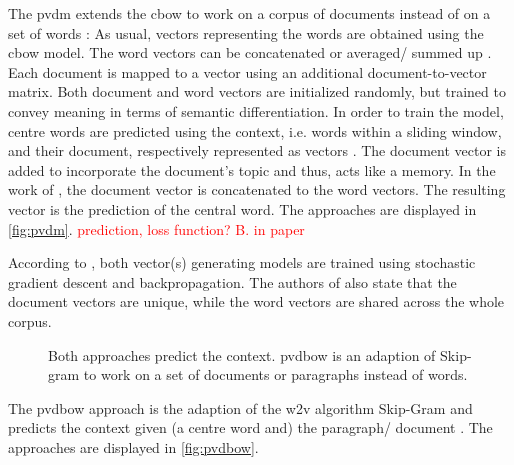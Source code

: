 The \ac{pvdm} extends the \ac{cbow} to work on a corpus of documents instead of on a set of words \cite{clusteringDocs2020}:
As usual, vectors representing the words are obtained using the \ac{cbow} model.
The word vectors can be concatenated or averaged/ summed up \cite{SentRep2014}.
Each document is mapped to a vector using an additional document-to-vector matrix.
Both document and word vectors are initialized randomly, but trained to convey meaning in terms of semantic differentiation.
In order to train the model, centre words are predicted using the context, i.e. words within a sliding window, 
and their document, respectively represented as vectors \cite{SentRep2014}.
The document vector is added to incorporate the document's topic and thus, acts like a memory.
In the work of \cite{SentRep2014}, the document vector is concatenated to the word vectors.
The resulting vector is the prediction of the central word.
The approaches are displayed in \autoref{fig:pvdm}.
\textcolor{red}{prediction, loss function? B. in paper}

According to \cite{SentRep2014}, both vector(s) generating models are trained using stochastic gradient descent and backpropagation.
The authors of \cite{SentRep2014} also state that the document vectors are unique, while the word vectors are shared across the whole corpus. 

\begin{figure}%
    \centering
    \qquad
    \caption{Both approaches predict the context.
    \ac{pvdbow} is an adaption of Skip-gram to work on a set of documents or paragraphs instead of words.
    }%
    \label{fig:pvdbow}%
\end{figure}
The \ac{pvdbow} approach is the adaption of the \ac{w2v} algorithm Skip-Gram and predicts the context given (a centre word and) the paragraph/ document \cite{SentRep2014}.
The approaches are displayed in \autoref{fig:pvdbow}.


